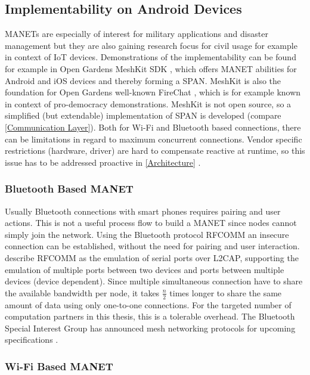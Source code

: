 	\subsection{Implementability on Android Devices}
	\label{Implementability}
	\glspl{MANET} are especially of interest for military applications and disaster management but they are also gaining research focus for civil usage for example in context of \gls{IoT} devices. Demonstrations of the implementability can be found for example in Open Gardens MeshKit \gls{SDK} \autocite{Online:MeshKit}, which offers \gls{MANET} abilities for Android and iOS devices and thereby forming a \gls{SPAN}. MeshKit is also the foundation for Open Gardens well-known FireChat \autocite{Online:FireChat}, which is for example known in context of pro-democracy demonstrations. MeshKit is not open source, so a simplified (but extendable) implementation of \gls{SPAN} is developed (compare \ref{Communication Layer}).
	Both for Wi-Fi and Bluetooth based connections, there can be limitations in regard to maximum concurrent connections. Vendor specific restrictions (hardware, driver) are hard to compensate reactive at runtime, so this issue has to be addressed proactive in \ref{Architecture} .
	
	\subsubsection{Bluetooth Based \gls{MANET}}
	Usually Bluetooth connections with smart phones requires pairing and user actions. This is not a useful process flow to build a \gls{MANET} since nodes cannot simply join the network. 
	Using the Bluetooth protocol \gls{RFCOMM} an insecure connection can be established, without the need for pairing and user interaction. \textcite{RFCOMM2012} describe \gls{RFCOMM} as the emulation of serial ports over \gls{L2CAP}, supporting the emulation of multiple ports between two devices and ports between multiple devices (device dependent).
	Since multiple simultaneous connection have to share the available bandwidth per node, it takes $\frac{n}{2}$ times longer to share the same amount of data using only one-to-one connections. For the targeted number of computation partners in this thesis, this is a tolerable overhead.
	The Bluetooth Special Interest Group has announced mesh networking protocols for upcoming specifications \autocite{Online:BluetoothMesh}. 
	

	\subsubsection{Wi-Fi Based \gls{MANET}}
			
